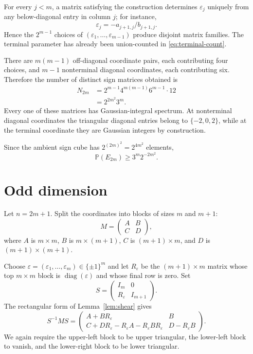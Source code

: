 \documentclass[11pt]{article}
\theoremstyle{remark}
\newcommand{\Pp}{\mathbb P}
\newcommand{\diag}{\operatorname{diag}}
\begin{document}
For every $j<m$, a matrix satisfying the construction determines $\varepsilon_j$ uniquely from any below-diagonal entry in column $j$; for instance,
\[
 \varepsilon_j=-a_{j+1,j}/b_{j+1,j}.
\]
Hence the $2^{m-1}$ choices of $(\varepsilon_1,\ldots,\varepsilon_{m-1})$ produce disjoint matrix families.  The terminal parameter has already been union-counted in \eqref{eq:terminal-count}.

There are $m(m-1)$ off-diagonal coordinate pairs, each contributing four choices, and $m-1$ nonterminal diagonal coordinates, each contributing six.  Therefore the number of distinct sign matrices obtained is
\begin{align}
 N_{2m}
 &=2^{m-1}4^{m(m-1)}6^{m-1}\cdot 12\\
 &=2^{2m^2}3^m.                                          \label{eq:even-count}
\end{align}
Every one of these matrices has Gaussian-integral spectrum.  At nonterminal diagonal coordinates the triangular diagonal entries belong to $\{-2,0,2\}$, while at the terminal coordinate they are Gaussian integers by construction.

Since the ambient sign cube has $2^{(2m)^2}=2^{4m^2}$ elements,
\begin{equation}\label{eq:even-prob}
 \Pp(E_{2m})\ge 3^m2^{-2m^2}.
\end{equation}

\section{Odd dimension}

Let $n=2m+1$.  Split the coordinates into blocks of sizes $m$ and $m+1$:
\[
 M=\begin{pmatrix}A&B\\ C&D\end{pmatrix},
\]
where $A$ is $m\times m$, $B$ is $m\times(m+1)$, $C$ is $(m+1)\times m$, and $D$ is $(m+1)\times(m+1)$.

Choose $\varepsilon=(\varepsilon_1,\ldots,\varepsilon_m)\in\{\pm1\}^m$ and let $R_\varepsilon$ be the $(m+1)\times m$ matrix whose top $m\times m$ block is $\diag(\varepsilon)$ and whose final row is zero.  Set
\[
 S=\begin{pmatrix}I_m&0\\R_\varepsilon&I_{m+1}\end{pmatrix}.
\]
The rectangular form of Lemma~\ref{lem:shear} gives
\begin{equation}\label{eq:odd-shear}
 S^{-1}MS
 =\begin{pmatrix}
 A+BR_\varepsilon&B\\
 C+DR_\varepsilon-R_\varepsilon A-R_\varepsilon BR_\varepsilon&D-R_\varepsilon B
 \end{pmatrix}.
\end{equation}
We again require the upper-left block to be upper triangular, the lower-left block to vanish, and the lower-right block to be lower triangular.
\end{document}

